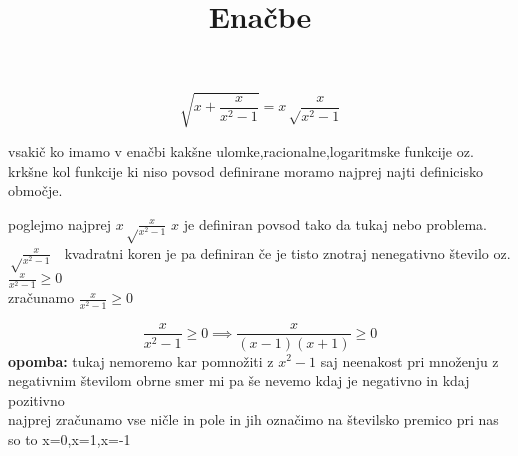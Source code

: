 \documentclass[a4paper]{article}
\begin{document}

\title{Enačbe}
\maketitle
\[
\sqrt{x+\frac{x}{x^{2}-1}}=x\sqrt\frac{x}{x^{2}-1}
\]

vsakič ko imamo v enačbi kakšne ulomke,racionalne,logaritmske funkcije oz. krkšne kol funkcije ki niso povsod definirane moramo najprej najti definicisko območje.

\vspace{1cm}
poglejmo najprej
\(x\sqrt\frac{x}{x^{2}-1}\) $ x$ je definiran povsod tako da tukaj nebo problema.\\
$\sqrt\frac{x}{x^{2}-1}\quad$kvadratni koren je pa definiran če je tisto znotraj nenegativno število oz. $\frac{x}{x^{2}-1}\geq0$\\
zračunamo $\frac{x}{x^{2}-1}\geq0$

\[\frac{x}{x^{2}-1}\geq0\implies\frac{x}{(x-1)(x+1)}\geq0\]
\textbf{opomba: }tukaj nemoremo kar pomnožiti z \(x^{2}-1\) saj neenakost pri množenju z negativnim številom obrne smer mi pa še nevemo kdaj je negativno in kdaj pozitivno\\

najprej zračunamo vse ničle in pole in jih označimo na številsko premico pri nas so to x=0,x=1,x=-1

\begin{center}
\end{center}
\end{document}
